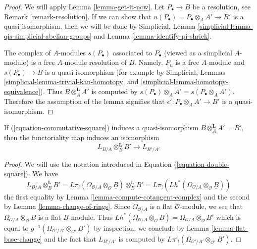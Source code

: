 \begin{proof}
We will apply Lemma \ref{lemma-get-it-now}. Let $P_\bullet \to B$ be a
resolution, see Remark \ref{remark-resolution}. If we can show that
$u(P_\bullet) = P_\bullet \otimes_A A' \to B'$ is a quasi-isomorphism, then
we will be done by
Simplicial, Lemma \ref{simplicial-lemma-qis-simplicial-abelian-groups}
and Lemma \ref{lemma-identify-pi-shriek}.

\medskip\noindent
The complex of $A$-modules $s(P_\bullet)$ associated to $P_\bullet$
(viewed as a simplicial $A$-module) is a free $A$-module resolution of $B$.
Namely, $P_n$ is a free $A$-module and $s(P_\bullet) \to B$ is a
quasi-isomorphism (for example by
Simplicial, Lemmas \ref{simplicial-lemma-trivial-kan-homotopy} and
\ref{simplicial-lemma-homotopy-equivalence}).
Thus $B \otimes_A^\mathbf{L} A'$ is computed by
$s(P_\bullet) \otimes_A A' = s(P_\bullet \otimes_A A')$.
Therefore the assumption of the lemma signifies that
$\epsilon' : P_\bullet \otimes_A A' \to B'$ is a quasi-isomorphism.
\end{proof}

\begin{lemma}
\label{lemma-flat-base-change-cotangent-complex}
If (\ref{equation-commutative-square}) induces a quasi-isomorphism
$B \otimes_A^\mathbf{L} A' = B'$, then the functoriality map
induces an isomorphism
$$
L_{B/A} \otimes_B^\mathbf{L} B' \longrightarrow L_{B'/A'}
$$
\end{lemma}

\begin{proof}
We will use the notation introduced in Equation (\ref{equation-double-square}).
We have
$$
L_{B/A} \otimes_B^\mathbf{L} B' =
L\pi_!(\Omega_{\mathcal{O}/A} \otimes_\mathcal{O} \underline{B})
\otimes_B^\mathbf{L} B' =
L\pi_!(Lh^*(\Omega_{\mathcal{O}/A} \otimes_\mathcal{O} \underline{B}))
$$
the first equality by Lemma \ref{lemma-compute-cotangent-complex}
and the second by Lemma \ref{lemma-change-of-rings}.
Since $\Omega_{\mathcal{O}/A}$ is a flat $\mathcal{O}$-module,
we see that $\Omega_{\mathcal{O}/A} \otimes_\mathcal{O} \underline{B}$
is a flat $\underline{B}$-module. Thus
$Lh^*(\Omega_{\mathcal{O}/A} \otimes_\mathcal{O} \underline{B}) =
\Omega_{\mathcal{O}/A} \otimes_\mathcal{O} \underline{B'}$
which is equal to
$g^{-1}(\Omega_{\mathcal{O}'/A'} \otimes_{\mathcal{O}'} \underline{B'})$
by inspection.
we conclude by Lemma \ref{lemma-flat-base-change}
and the fact that $L_{B'/A'}$ is computed by
$L\pi'_!(\Omega_{\mathcal{O}'/A'} \otimes_{\mathcal{O}'} \underline{B'})$.
\end{proof}

